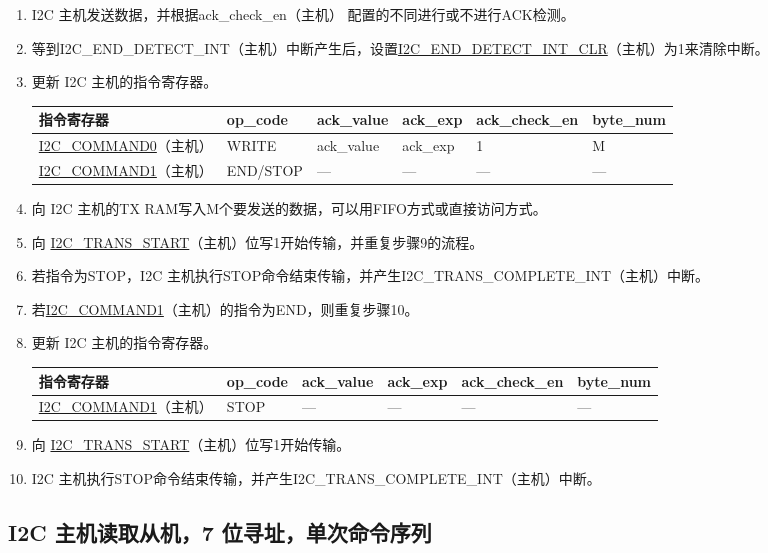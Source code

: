 \documentclass[main\_\_CN.tex]{subfiles}
\begin{document}
\begin{enumerate}
\item I2C 主机发送数据，并根据ack\_check\_en（主机） 配置的不同进行或不进行ACK检测。

\item 等到I2C\_END\_DETECT\_INT（主机）中断产生后，设置\hyperref[fielddesc:I2CENDDETECTINTCLR]{I2C\_END\_DETECT\_INT\_CLR}（主机）为1来清除中断。
\item 更新 I2C 主机的指令寄存器。
\begin{longtable}{ | p{4cm} | p{2cm} | p{2cm} | p{2cm} |p{2cm} | p{2cm} |}
\hline\rowcolor{lightgray}
指令寄存器& op\_code & ack\_value&ack\_exp&ack\_check\_en&byte\_num  \\ \hline
\hyperref[fielddesc:I2CCOMMAND0]{I2C\_COMMAND0}（主机）& WRITE& ack\_value&ack\_exp&1&M  \\ \hline
\hyperref[fielddesc:I2CCOMMAND1]{I2C\_COMMAND1}（主机）& END/STOP& ---&---&---&---  \\ \hline
\end{longtable}
\item 向 I2C 主机的TX RAM写入M个要发送的数据，可以用FIFO方式或直接访问方式。
\item 向 \hyperref[fielddesc:I2CTRANSSTART]{I2C\_TRANS\_START}（主机）位写1开始传输，并重复步骤9的流程。
\item 若指令为STOP，I2C 主机执行STOP命令结束传输，并产生I2C\_TRANS\_COMPLETE\_INT（主机）中断。
\item 若\hyperref[fielddesc:I2CCOMMAND1]{I2C\_COMMAND1}（主机）的指令为END，则重复步骤10。
\item 更新 I2C 主机的指令寄存器。
\begin{longtable}{ | p{4cm} | p{2cm} | p{2cm} | p{2cm} |p{2cm} | p{2cm} |}
\hline\rowcolor{lightgray}
指令寄存器& op\_code & ack\_value&ack\_exp&ack\_check\_en&byte\_num  \\ \hline
\hyperref[fielddesc:I2CCOMMAND1]{I2C\_COMMAND1}（主机）& STOP& ---&---&---&---  \\ \hline
\end{longtable}
\item 向 \hyperref[fielddesc:I2CTRANSSTART]{I2C\_TRANS\_START}（主机）位写1开始传输。
\item I2C 主机执行STOP命令结束传输，并产生I2C\_TRANS\_COMPLETE\_INT（主机）中断。

\end{enumerate}



\subsection{I2C 主机读取从机，7 位寻址，单次命令序列}
\end{document}
